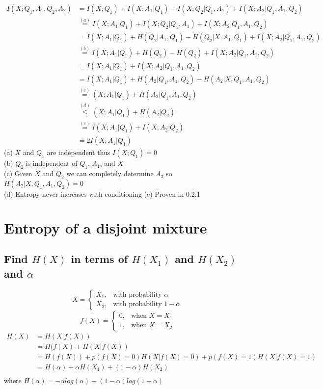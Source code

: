 \documentclass[11pt, oneside]{book}   	%
\begin{document}
\begin{equation}
\begin{split}
 I(X;Q_1,A_1,Q_2,A_2) & = I(X;Q_1) + I(X;A_1|Q_1) + I(X;Q_2|Q_1,A_1) + I(X;A_2|Q_1, A_1, Q_2)\\
 & \overset{(a)}{=} I(X;A_1|Q_1) + I(X;Q_2|Q_1,A_1) + I(X;A_2|Q_1, A_1, Q_2)\\
 & = I(X;A_1|Q_1) + H(Q_2|A_1,Q_1) - H(Q_2|X,A_1,Q_1) + I(X;A_2|Q_1, A_1, Q_2)\\
 & \overset{(b)}{=} I(X;A_1|Q_1) + H(Q_2) - H(Q_2) + I(X;A_2|Q_1, A_1, Q_2)\\
 & = I(X;A_1|Q_1) + I(X;A_2|Q_1, A_1, Q_2)\\
 & = I(X;A_1|Q_1) + H(A_2|Q_1,A_1,Q_2) - H(A_2|X,Q_1,A_1,Q_2)\\
 & \overset{(c)}{=} (X;A_1|Q_1) + H(A_2|Q_1,A_1,Q_2)\\
 & \overset{(d)}{\leq} (X;A_1|Q_1) + H(A_2|Q_2)\\
 & \overset{(e)}{=} I(X;A_1|Q_1)+I(X;A_2|Q_2)\\
 & = 2I(X;A_1|Q_1)
\end{split}
\end{equation}
(a) $X$ and $Q_1$ are independent thus $I(X;Q_1)=0$\\
(b) $Q_2$ is independent of $Q_1$, $A_1$, and $X$\\
(c) Given $X$ and $Q_2$ we can completely determine $A_2$ so $H(A_2|X,Q_1,A_1,Q_2) = 0$\\
(d) Entropy never increases with conditioning
(e) Proven in 0.2.1

\section{Entropy of a disjoint mixture}
\subsection{Find $H(X)$ in terms of $H(X_1)$ and $H(X_2)$ and $\alpha$}

\[
    X= 
\begin{cases}
    X_1, & \text{with probability } \alpha\\
    X_2, & \text{with probability } 1-\alpha
\end{cases}
\]
\[
    f(X)= 
\begin{cases}
    0, & \text{when } X=X_1\\
    1, & \text{when } X=X_2
\end{cases}
\]
\begin{equation}
\begin{split}
 H(X) & = H(X|f(X))\\
 & = H(f(X) + H(X|f(X))\\
 & = H(f(X)) + p(f(X)=0)H(X|f(X)=0) +p(f(X)=1)H(X|f(X)=1)\\
 & = H(\alpha) + \alpha H(X_1) + (1-\alpha)H(X_2)\\
\end{split}
\end{equation}
where $H(\alpha) = -\alpha log( \alpha) - (1-\alpha)log(1-\alpha)$
\end{document}

